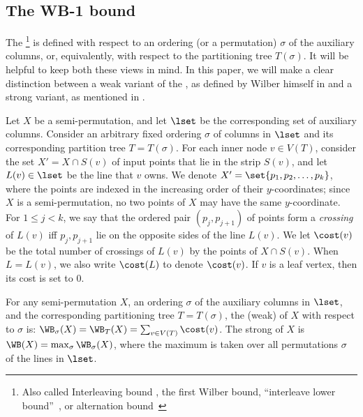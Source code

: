 \documentclass{toc}
\begin{document}
%
%
%
%
%
%
%




%
%
%
\subsection{The WB-1 bound}\label{sec: WB def}
%
%


The \WBone\footnote{Also called Interleaving bound \cite{tango}, the first Wilber bound, ``interleave lower bound''~\cite{wilber}, or alternation bound~\cite{in_pursuit}} is defined with respect to an ordering (or a permutation) $\sigma$ of the auxiliary columns, or,  equivalently, with respect to the partitioning tree $T(\sigma)$. 
It will be helpful to keep both these views in mind. 
In this paper, we will make a clear distinction between a weak variant of the \WBone, as defined by Wilber himself in \cite{wilber} and a strong variant, as mentioned in \cite{in_pursuit}.  

Let $X$ be a semi-permutation, and let $\lset$ be the corresponding set of auxiliary columns. 
Consider an arbitrary fixed ordering $\sigma$ of columns in $\lset$ and its corresponding partition tree $T = T(\sigma)$.   
For each inner node $v \in V(T)$, consider the set $X' = X \cap S(v)$ of input points that lie in the strip $S(v)$, and let $L(v)\in \lset$ be the line that $v$ owns.
We denote $X'=\set{p_1,p_2,\ldots,p_k}$, where the points are indexed in the increasing order of their $y$-coordinates; since $X$ is a semi-permutation, no two points of $X$ may have the same $y$-coordinate. 
For $1\leq j<k$, we say that the ordered pair $(p_j,p_{j+1})$ of points form a \emph{crossing} of $L(v)$ iff $p_j,p_{j+1}$ lie on the opposite sides of the line $L(v)$. 
We let $\cost(v)$ be the total number of crossings of $L(v)$ by the points of $X \cap S(v)$. When $L = L(v)$, we also write $\cost(L)$ to denote $\cost(v)$. If $v$ is a leaf vertex, then its cost is set to $0$.
%


\begin{definition}[\WBone] 
For any semi-permutation $X$, an ordering $\sigma$ of the auxiliary columns in $\lset$, and the corresponding partitioning tree $T=T({\sigma})$,
the (weak) \WBone of $X$ with respect to $\sigma$ is: 
$\WB_{\sigma}(X) =  \WB_{T}(X) = \sum_{v \in V(T)} \cost(v)$.
The strong \WBone of $X$ is $\WB(X) = \max_{\sigma} \WB_{\sigma}(X)$, where the maximum is taken over all permutations $\sigma$ of the lines in $\lset$.  
\end{definition} 
\end{document}

